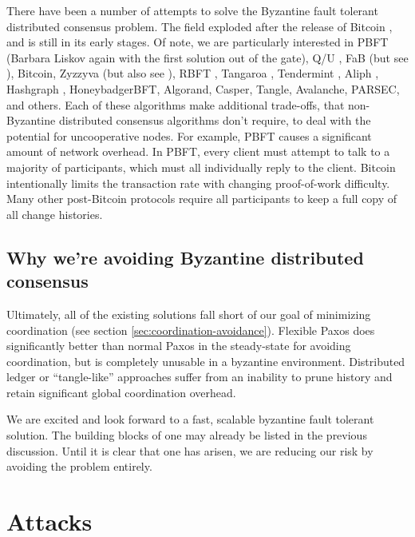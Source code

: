 \documentclass[11pt,fleqn,openany]{book}
\begin{document}
There have been a number of attempts to solve the Byzantine fault tolerant
distributed consensus problem. The field exploded after the release of Bitcoin
\cite{bitcoin}, and is still in its early stages. Of note, we are particularly
interested in PBFT \cite{pbft} (Barbara Liskov again with the
first solution out of the gate), Q/U \cite{qu}, FaB \cite{fab} (but see
\cite{fab-revisited}), Bitcoin, Zyzzyva \cite{zyzzyva} (but also
see \cite{fab-revisited}), RBFT \cite{rbft}, Tangaroa \cite{tangaroa},
Tendermint \cite{tendermint}, Aliph \cite{aliph}, Hashgraph \cite{hashgraph},
HoneybadgerBFT\cite{honeybadger}, Algorand\cite{algorand}, Casper\cite{casper},
Tangle\cite{tangle}, Avalanche\cite{avalanche}, PARSEC\cite{parsec}, and
others\cite{mickens-bft}.
Each of these algorithms make
additional trade-offs, that non-Byzantine distributed consensus algorithms don't
require, to deal with the potential for uncooperative nodes. For example,
PBFT \cite{pbft} causes a significant amount of network overhead. In PBFT, every
client must attempt to talk to a majority of participants, which must all
individually reply to the client. Bitcoin
\cite{bitcoin} intentionally limits the transaction rate with changing
proof-of-work difficulty. Many other post-Bitcoin protocols require all
participants to keep a full copy of all change histories.

\section{Why we're avoiding Byzantine distributed consensus}

Ultimately, all of the existing solutions fall short of our goal of minimizing
coordination (see section \ref{sec:coordination-avoidance}). Flexible Paxos
\cite{paxos-flexible} does significantly better than normal Paxos in the
steady-state for avoiding coordination, but is completely unusable in a
byzantine environment. Distributed ledger or ``tangle-like'' approaches suffer
from an inability to prune history and retain significant global coordination
overhead.

We are excited and look forward to a fast, scalable byzantine fault tolerant
solution. The building blocks of one may already be listed in the previous
discussion. Until it is clear that one has arisen, we are reducing our risk
by avoiding the problem entirely.

\chapter{Attacks}
\end{document}
